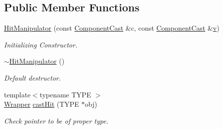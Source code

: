 \subsection*{Public Member Functions}
\begin{DoxyCompactItemize}
\item 
\hyperlink{class_d_d4hep_1_1_simulation_1_1_geant4_hit_wrapper_1_1_hit_manipulator_ab04f459fb64ae024b2dcf7f7fb0d7775}{HitManipulator} (const \hyperlink{class_d_d4hep_1_1_component_cast}{ComponentCast} \&c, const \hyperlink{class_d_d4hep_1_1_component_cast}{ComponentCast} \&\hyperlink{_multi_view_8cpp_a8320ee13ac034dbf6d624fe8953dd337}{v})
\begin{DoxyCompactList}\small\item\em Initializing Constructor. \item\end{DoxyCompactList}\item 
\hyperlink{class_d_d4hep_1_1_simulation_1_1_geant4_hit_wrapper_1_1_hit_manipulator_a61e4ad1fbefa9c366136011854d033e0}{$\sim$HitManipulator} ()
\begin{DoxyCompactList}\small\item\em Default destructor. \item\end{DoxyCompactList}\item 
{\footnotesize template$<$typename TYPE $>$ }\\\hyperlink{class_d_d4hep_1_1_simulation_1_1_geant4_hit_wrapper_1_1_hit_manipulator_a4bb62cc7e4979a8d0aea281477a4e38e}{Wrapper} \hyperlink{class_d_d4hep_1_1_simulation_1_1_geant4_hit_wrapper_1_1_hit_manipulator_a8ea3f2054e5c167ad0cc904b070c9a1c}{castHit} (TYPE $\ast$obj)
\begin{DoxyCompactList}\small\item\em Check pointer to be of proper type. \item\end{DoxyCompactList}\end{DoxyCompactItemize}
